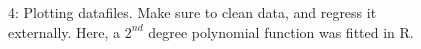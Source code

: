 \documentclass{beamer}
\begin{document}
\begin{frame}
  \begin{figure}
    \center
    \begin{tikzpicture}
    \end{tikzpicture}
    \caption{4: Plotting datafiles. Make sure to clean data, and regress it externally. Here, a $2^{nd}$ degree polynomial function was fitted in R.}
  \end{figure}
\end{frame}
\end{document}

